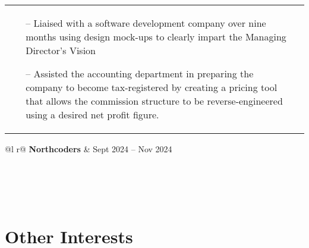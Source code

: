 \documentclass[a4paper,12pt]{article}
\begin{document}
\begin{tabularx}{\linewidth}{ @{}l r@{} }
{\begin{minipage}[t]{\linewidth}
\begin{itemize}[nosep,after=\strut, leftmargin=1em, itemsep=3pt]
            \item[--] Liaised with a software development company over nine months using design mock-ups to clearly impart the Managing Director’s Vision
            \item[--] Assisted the accounting department in preparing the company to become tax-registered by creating a pricing tool that allows the commission structure to be reverse-engineered using a desired net profit figure.
        \end{itemize}
    \end{minipage}
    }
\end{tabularx}

\vspace{3mm}

\begin{tabularx}{\linewidth}{ @{}l r@{} }
    \textbf{Northcoders} & \hfill Sept 2024 -- Nov 2024 \\[3.75pt]
    \vspace{-5mm}                                       \\
               \\
                                                       \\
    \vspace{-3mm}                                       \\
\end{tabularx}
\section{Other Interests}
\end{document}
